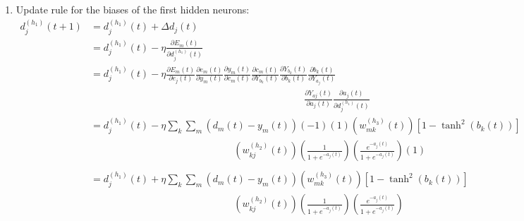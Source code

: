 \documentclass[12pt,a4paper]{article}
\begin{document}
\begin{CJK}{UTF8}{bsmi}
\begin{enumerate}
\begin{enumerate}
\newpage
\item Update rule for the biases of the first hidden neurons:
\vspace{0.5cm}
\\
$
\begin{aligned}
d_{j}^{(h_1)}(t+1) & =d_{j}^{(h_1)}(t)+\Delta d_{j}(t)
\\[0.5cm]
& =d_{j}^{(h_1)}(t)-\eta\frac{\partial E_m(t)}{\partial d_{j}^{(h_1)}(t)}
\\[0.5cm]
& =d_{j}^{(h_1)}(t)-\eta\frac{\partial E_m(t)}{\partial e_{j}(t)}
\frac{\partial e_{m}(t)}{\partial y_m(t)}
\frac{\partial y_m(t)}{\partial c_{m}(t)}
\frac{\partial c_m(t)}{\partial Y_{b_k}(t)}
\frac{\partial Y_{b_k}(t)}{\partial b_k(t)}
\frac{\partial b_k(t)}{\partial Y_{a_j}(t)}
\\[0.5cm]
&\ \hspace{9cm}
\frac{\partial Y_{aj}(t)}{\partial a_j(t)}
\frac{\partial a_{j}(t)}{\partial d_{j}^{(h_1)}(t)}
\\[0.5cm]
& =d_{j}^{(h_1)}(t)-\eta\sum_k\sum_m(d_m(t)-y_m(t))(-1)(1)(w_{mk}^{(h_3)}(t))
[1-\tanh^2(b_k(t))]
\\[0.5cm]
&\ \hspace{6cm}
(w_{kj}^{(h_2)}(t))(\frac{1}{1+ e^{-a_j(t)}})
(\frac{e^{-a_j(t)}}{1+ e^{-a_j(t)}})(1)
\\[0.5cm]
\\[0.5cm]
& =d_{j}^{(h_1)}(t)+\eta\sum_k\sum_m(d_m(t)-y_m(t))(w_{mk}^{(h_3)}(t))[1-\tanh^2(b_k(t))]
\\[0.5cm]
&\ \hspace{6cm}
(w_{kj}^{(h_2)}(t))(\frac{1}{1+ e^{-a_j(t)}})
(\frac{e^{-a_j(t)}}{1+ e^{-a_j(t)}})
\end{aligned}
$
\end{enumerate}
\end{enumerate}
\end{CJK}
\end{document}

